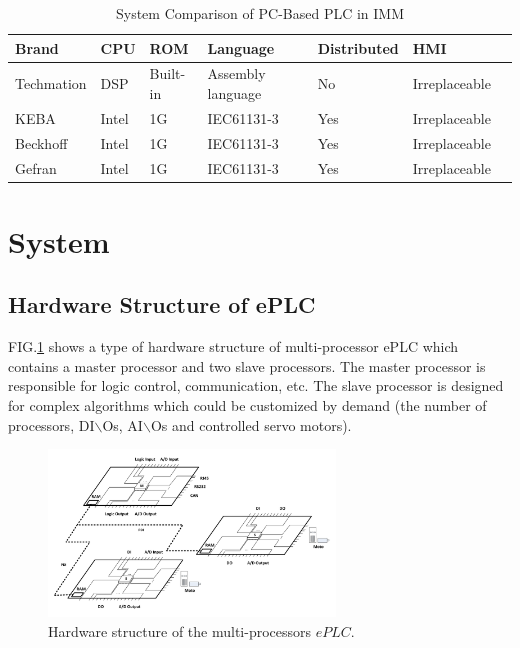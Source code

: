 \documentclass[journal,UTF8]{IEEEtran}
\begin{document}
\begin{table}
	\scriptsize \caption{System Comparison of PC-Based PLC in IMM}
	\label{table:IMMControllor}
	\begin{center}
		\renewcommand{\arraystretch}{1.4}
		\setlength\tabcolsep{3pt}
		\begin{tabular}{|p{1.1cm}|p{0.5cm}|p{0.8cm}|p{1.8cm}|p{1.5cm}|p{1.5cm}|p{1cm}|}
			\hline
			Brand       & CPU    & ROM & Language       & Distributed  & HMI\\
			\hline
			Techmation  & DSP    & Built-in  & Assembly language        &No  & Irreplaceable \\
			\hline
			KEBA        & Intel  & 1G  & IEC61131-3                 &Yes    & Irreplaceable\\
			\hline
			Beckhoff    & Intel  & 1G  & IEC61131-3               &Yes   &Irreplaceable\\
			\hline
			Gefran      & Intel  & 1G  &IEC61131-3                 &Yes   &Irreplaceable\\
			\hline
		\end{tabular}
	\end{center}
\end{table}
\section{System}
\label{MultiProcessorePLC}
\subsection{Hardware Structure of ePLC}
FIG.\ref{fig:HardwareStructure} shows a type of hardware structure of multi-processor ePLC which contains a master processor and two slave processors. The master processor is responsible for logic control, communication, etc. The slave processor is designed for complex algorithms which could be customized by demand (the number of processors, DI$\backslash$Os, AI$\backslash$Os and controlled servo motors).
\begin{figure}
	\centering
	\includegraphics[width=3in]{fig/FIG2.pdf}
	\caption{ Hardware structure of the multi-processors $ePLC$.}
	\label{fig:HardwareStructure}
\end{figure}
\end{document}
